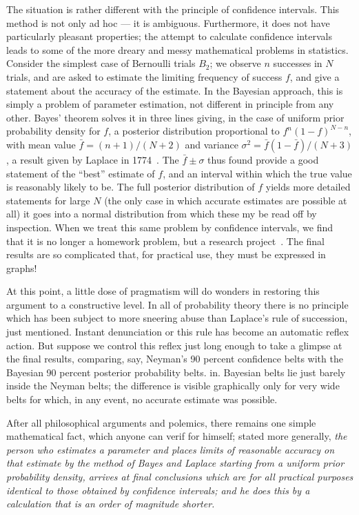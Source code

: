 \documentclass[12pt]{article}
\let\oldcite\cite
\renewcommand{\cite}{~\oldcite}
\begin{document}
The situation is rather different with the principle of confidence
intervals. This method is not only ad hoc --- it is ambiguous. Furthermore,
it does not have particularly pleasant properties; the attempt to calculate
confidence intervals leads to some of the more dreary and messy mathematical
problems in statistics.
Consider the simplest case of Bernoulli trials $B_2$; we observe $n$ successes in $N$ trials, and are asked to estimate the
limiting frequency of success $f$, and give a statement about the accuracy
of the estimate. In the Bayesian approach, this is simply a problem of
parameter estimation, not different in principle from any other. Bayes'
theorem solves it in three lines giving, in the case of uniform prior
probability density for $f$, a posterior distribution proportional to
$f^n (1-f)^{N-n}$, with mean value $\bar f = (n+1)/(N+2)$ and variance $\sigma^2 =\bar f (1-\bar f) / (N+3)$,
a result given by Laplace in 1774\cite{laplace}.
The $\bar f \pm \sigma$ thus found
provide a good statement of the ``best'' estimate of $f$, and an interval
within which the true value is reasonably likely to be. The full posterior
distribution of $f$ yields more detailed statements for large $N$ (the
only case in which accurate estimates are possible at all) it goes into
a normal distribution from which these my be read off by inspection.
When we treat this same problem by confidence intervals, we find that it
is no longer a homework problem, but a research project\cite{pearson}. The final
results are so complicated that, for practical use, they must be expressed
in graphs!

At this point, a little dose of pragmatism will do wonders in
restoring this argument to a constructive level. In all of probability
theory there is no principle which has been subject to more sneering abuse
than Laplace's rule of succession, just mentioned. Instant denunciation
or this rule has become an automatic reflex action. But suppose we control
this reflex just long enough to take a glimpse at the final results,
comparing, say, Neyman's 90 percent confidence belts with the Bayesian
90 percent posterior probability belts. in. Bayesian belts lie just barely
inside the Neyman belts; the difference is visible graphically only for
very wide belts for which, in any event, no accurate estimate was possible.

 After all philosophical arguments and polemics, there remains one simple mathematical fact, which anyone can verif for himself; stated more generally, \emph{the person who estimates a parameter and places limits of reasonable accuracy on that estimate by the method of Bayes and Laplace starting from a uniform prior probability density, arrives at final conclusions which are for all practical purposes identical to those obtained by confidence intervals; and he does this by a calculation that is an order of magnitude shorter.}
\end{document}
